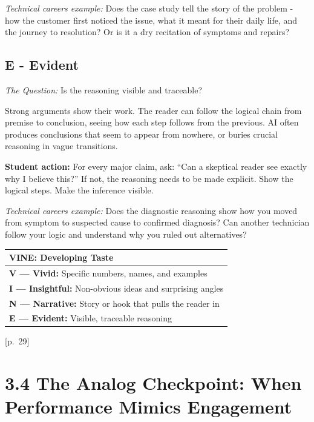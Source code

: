 \documentclass[
  letterpaper,
  DIV=11,
  numbers=noendperiod]{scrreprt}
\newcounter{none} %
\begin{document}
\emph{Technical careers example:} Does the case study tell the story of
the problem - how the customer first noticed the issue, what it meant
for their daily life, and the journey to resolution? Or is it a dry
recitation of symptoms and repairs?

\subsection{E - Evident}\label{e---evident}

\emph{The Question:} Is the reasoning visible and traceable?

Strong arguments show their work. The reader can follow the logical
chain from premise to conclusion, seeing how each step follows from the
previous. AI often produces conclusions that seem to appear from
nowhere, or buries crucial reasoning in vague transitions.

\textbf{Student action:} For every major claim, ask: ``Can a skeptical
reader see exactly why I believe this?'' If not, the reasoning needs to
be made explicit. Show the logical steps. Make the inference visible.

\emph{Technical careers example:} Does the diagnostic reasoning show how
you moved from symptom to suspected cause to confirmed diagnosis? Can
another technician follow your logic and understand why you ruled out
alternatives?

{\def\LTcaptype{none} %
\begin{longtable}[]{@{}l@{}}
\toprule\noalign{}
\textbf{VINE: Developing Taste} \\
\midrule\noalign{}
\endhead
\bottomrule\noalign{}
\endlastfoot
\textbf{V --- Vivid:} Specific numbers, names, and examples \\
\textbf{I --- Insightful:} Non-obvious ideas and surprising angles \\
\textbf{N --- Narrative:} Story or hook that pulls the reader in \\
\textbf{E --- Evident:} Visible, traceable reasoning \\
\end{longtable}
}

{[}p.~29{]}

\section{3.4 The Analog Checkpoint: When Performance Mimics
Engagement}\label{the-analog-checkpoint-when-performance-mimics-engagement}
\end{document}

